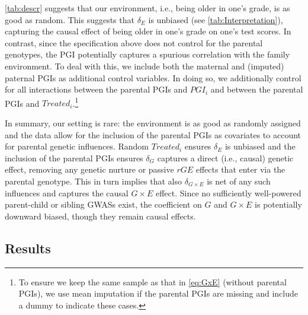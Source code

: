 \documentclass[12pt,a4paper]{article}
\begin{document}
\begin{bibunit}
\autoref{tab:descr} suggests that our environment, i.e., being older in one's grade, is as good as random. This suggests that $\delta_E$ is unbiased (see \autoref{tab:Interpretation}), capturing the causal effect of being older in one's grade on one's test scores. In contrast, since the specification above does not control for the parental genotypes, the PGI potentially captures a spurious correlation with the family environment. To deal with this, we include both the maternal and (imputed) paternal PGIs as additional control variables. In doing so, we additionally control for all interactions between the parental PGIs and $PGI_i$ and between the parental PGIs and $Treated_i$.\footnote{To ensure we keep the same sample as that in \autoref{eq:GxE} (without parental PGIs), we use mean imputation if the parental PGIs are missing and include a dummy to indicate these cases.}

In summary, our setting is rare: the environment is as good as randomly assigned and the data allow for the inclusion of the parental PGIs as covariates to account for parental genetic influences. Random $Treated_i$ ensures $\delta_E$ is unbiased and the inclusion of the parental PGIs ensures $\delta_G$ captures a direct (i.e., causal) genetic effect, removing any genetic nurture or passive $rGE$ effects that enter via the parental genotype. This in turn implies that also $\delta_{G \times E}$ is net of any such influences and captures the causal $G \times E$ effect. Since no sufficiently well-powered parent-child or sibling GWASs exist, the coefficient on $G$ and $G \times E$ is potentially downward biased, though they remain causal effects. 

\subsection{Results} \label{sec:results}

\end{bibunit}
\end{document}
